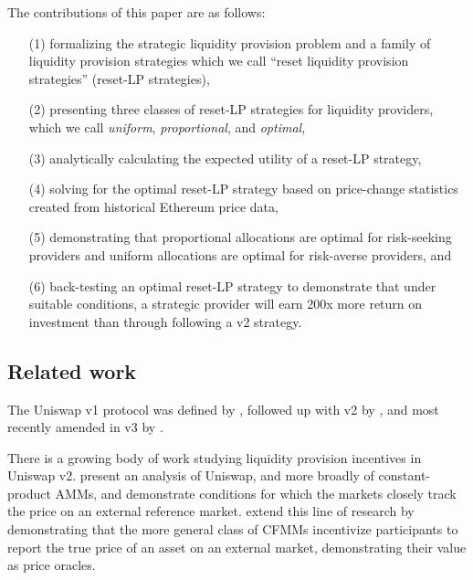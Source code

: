 \documentclass[sigconf, usenames, dvipsnames]{acmart}
\begin{document}
The contributions of this paper are as follows:
\begin{enumerate}
    \item[(1)] formalizing the strategic liquidity provision problem and a family of liquidity provision strategies which we call ``reset liquidity provision strategies'' (reset-LP strategies),
    \item[(2)] presenting three classes of reset-LP strategies for liquidity providers, which we call \textit{uniform}, \textit{proportional}, and \textit{optimal},
    \item[(3)] analytically calculating the expected utility of a reset-LP strategy,
    \item[(4)] solving for the optimal reset-LP strategy based on price-change statistics created from historical Ethereum price data,
    \item[(5)] demonstrating that proportional allocations are optimal for risk-seeking providers and uniform allocations are optimal for risk-averse providers, and
    \item[(6)] back-testing an optimal reset-LP strategy to demonstrate that under suitable conditions, a strategic provider will earn 200x more return on investment than through following a v2 strategy.
\end{enumerate}




\subsection{Related work}
The Uniswap v1 protocol was defined by \citet{uniswapv1white}, followed up with v2 by \citet{adams2020uniswap}, and most recently amended in v3 by \citet{adams2021uniswap}. 
%

There is a growing body of work studying liquidity provision incentives in Uniswap v2.  
\citet{angeris2019analysis} present an analysis of Uniswap, and more broadly of constant-product AMMs, and demonstrate conditions for which the markets closely track the price on an external reference market. \citet{angeris2020improved} extend this line of research by demonstrating that the more general class of CFMMs incentivize participants to report the true price of an asset on an external market, demonstrating their value as price oracles.
\end{document}
